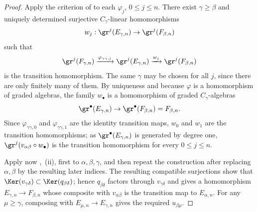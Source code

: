 \begin{proof}
Apply the criterion of  to each $\varphi_j$, $0\leq j\leq n$.
There exist $\gamma\geq\beta$ and uniquely determined surjective $C_\gamma$-linear homomorphisms
\[
  w_j:\gr^j(E_{\gamma,n})\to\gr^j(F_{\beta,n})
\]
such that
\[
  \gr^j(F_{\gamma,n})\xrightarrow{\varphi_{\gamma\gamma,j}}\gr^j(E_{\gamma,n})\xrightarrow{w_j}\gr^j(F_{\beta,n})
\]
is the transition homomorphism.
The same $\gamma$ may be chosen for all $j$, since there are only finitely many of them.
By uniqueness and because $\varphi$ is a homomorphism of graded algebras, the family $w_\bullet$ is a homomorphism of graded $C_\gamma$-algebras
\[
  \gr^\bullet(E_{\gamma,n})\to\gr^\bullet(F_{\beta,n})=F_{\beta,n}.
\]
Since $\varphi_{\gamma\gamma,0}$ and $\varphi_{\gamma\gamma,1}$ are the identity transition maps, $w_0$ and $w_1$ are the transition homomorphisms; as $\gr^\bullet(E_{\gamma,n})$ is generated by degree one, $\gr^j(v_{\alpha\beta}\circ w_\bullet)$ is the transition homomorphism for every $0\leq j\leq n$.

Apply now ,~(ii), first to $\alpha,\beta,\gamma$, and then repeat the construction after replacing $\alpha,\beta$ by the resulting later indices.
The resulting compatible surjections show that $\Ker(v_{\gamma\delta})\subset\Ker(q_{\beta\delta})$; hence $q_{\beta\delta}$ factors through $v_{\gamma\delta}$ and gives a homomorphism $E_{\gamma,n}\to F_{\beta,n}$ whose composite with $v_{\alpha\beta}$ is the transition map to $E_{\alpha,n}$.
For any $\mu\geq\gamma$, composing with $E_{\mu,n}\to E_{\gamma,n}$ gives the required $u_{\beta\mu}$.
\end{proof}


